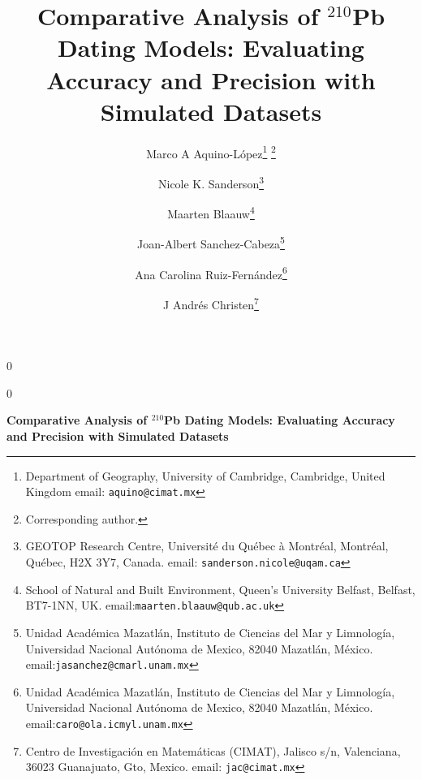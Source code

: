 \documentclass [10pt] {article}
\date{ }
\newcommand{\blind}{0}
\newcommand{\papertitle}{
	Comparative Analysis of $^{210}$Pb Dating Models: Evaluating Accuracy and Precision with Simulated Datasets
}
\begin{document}
	\def\spacingset#1{\renewcommand{\baselinestretch}%
		{#1}\small\normalsize} \spacingset{1}
	\blind
	{
		\title{\textbf{\papertitle}}

		\author{Marco A Aquino-L\'opez\thanks{
				Department of Geography, University of Cambridge, 
				Cambridge, United Kingdom
				email: \texttt{aquino@cimat.mx} } \thanks{Corresponding author.}
					\and
			Nicole K. Sanderson\thanks{
				GEOTOP Research Centre, Université du Québec à Montréal, 
				Montréal, Québec, H2X 3Y7, Canada. 
				email: \texttt{sanderson.nicole@uqam.ca}}
					\and
			Maarten Blaauw\thanks{School of Natural and Built Environment,
				Queen's University Belfast,
				Belfast, BT7-1NN, UK.
				email:\texttt{maarten.blaauw@qub.ac.uk}  }
					\and
			Joan-Albert Sanchez-Cabeza\thanks{
				Unidad Acad\'emica Mazatl\'an, 
				Instituto de Ciencias del Mar y Limnolog\'ia, 
				Universidad Nacional Aut\'onoma de Mexico, 
				82040 Mazatl\'an, M\'exico.
				email:\texttt{jasanchez@cmarl.unam.mx}} 
					\and
			Ana Carolina Ruiz-Fernández\thanks{
				Unidad Acad\'emica Mazatl\'an, 
				Instituto de Ciencias del Mar y Limnolog\'ia, 
				Universidad Nacional Aut\'onoma de Mexico, 
				82040 Mazatl\'an, M\'exico.
				email:\texttt{caro@ola.icmyl.unam.mx}} 
					\and
			J Andr\'es Christen\thanks{
				Centro de Investigaci\'on en Matem\'aticas (CIMAT),
				Jalisco s/n, Valenciana, 36023 Guanajuato, Gto, Mexico.
				email: \texttt{jac@cimat.mx}  }
			}
		\maketitle
	} \fi

	\blind
	{
		\bigskip
		\bigskip
		\bigskip
		\begin{center}
			{\LARGE\bf \papertitle}
		\end{center}
		\medskip
	} \fi
\bigskip
\end{document}
